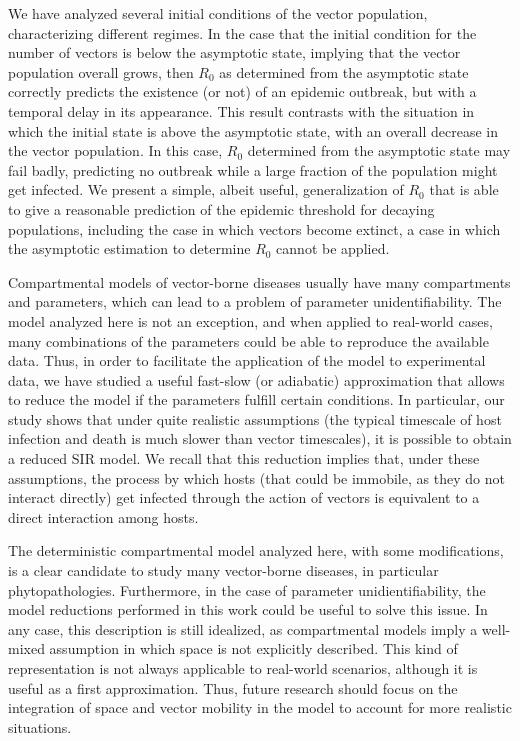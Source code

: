 We have analyzed several initial conditions of the vector population,
characterizing different regimes. In the case that the initial condition for
the number of vectors is below the asymptotic state, implying that the vector
population overall grows, then $R_0$ as determined from the asymptotic state
correctly predicts the existence (or not) of an epidemic outbreak, but with a
temporal delay in its appearance. This result contrasts with the situation in
which the initial state is above the asymptotic state, with an overall decrease
in the vector population. In this case, $R_0$ determined from the asymptotic
state may fail badly, predicting no outbreak while a large fraction of the
population might get infected. We present a simple, albeit useful,
generalization of $R_0$ that is able to give a reasonable prediction of the
epidemic threshold for decaying populations, including the case in which
vectors become extinct, a case in which the asymptotic estimation to determine
$R_0$ cannot be applied.

Compartmental models of vector-borne diseases usually have many
compartments and parameters, which can lead to a problem of parameter
unidentifiability. The model analyzed here is not an exception, and when
applied to real-world cases, many combinations of the parameters could
be able to reproduce the available data. Thus, in order to facilitate the
application of the model to experimental data, we have studied a useful
fast-slow (or adiabatic) approximation that allows to reduce the model if the
parameters fulfill certain conditions. In particular, our study shows that
under quite realistic assumptions (the typical timescale of host infection and
death is much slower than vector timescales), it is possible to obtain a
reduced SIR model. We recall that this reduction implies that, under these
assumptions, the process by which hosts (that could be immobile, as they do not
interact directly) get infected through the action of vectors is equivalent to
a direct interaction among hosts.

The deterministic compartmental model analyzed here, with some
modifications, is a clear candidate to study many vector-borne diseases, in
particular phytopathologies. Furthermore, in the case of parameter
unidientifiability, the model reductions performed in this work could be useful
to solve this issue. In any case, this description is still idealized, as
compartmental models imply a well-mixed assumption in which space is not
explicitly described. This kind of representation is not always applicable to
real-world scenarios, although it is useful as a first approximation. Thus,
future research should focus on the integration of space and vector mobility in
the model to account for more realistic situations.